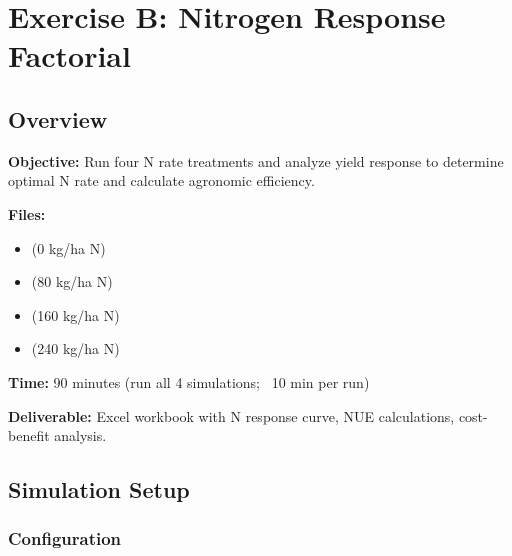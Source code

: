 
\chapter{Exercise B: Nitrogen Response Factorial}
\label{ch:exercise-b}

\section{Overview}

\textbf{Objective:} Run four N rate treatments and analyze yield response to determine optimal N rate and calculate agronomic efficiency.

\textbf{Files:} 
\begin{itemize}
  \item {} (0 kg/ha N)
  \item {} (80 kg/ha N)
  \item {} (160 kg/ha N)
  \item {} (240 kg/ha N)
\end{itemize}

\textbf{Time:} 90 minutes (run all 4 simulations; ~10 min per run)

\textbf{Deliverable:} Excel workbook with N response curve, NUE calculations, cost-benefit analysis.

\section{Simulation Setup}

\subsection{Configuration}

